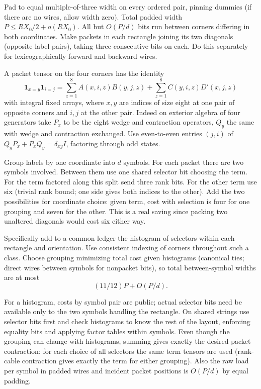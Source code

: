 \documentclass[11pt,letterpaper]{article}
\theoremstyle{definition}
\numberwithin{equation}{section}
\begin{document}
Pad to equal multiple-of-three width on every ordered pair, pinning dummies (if there
are no wires, allow width zero). Total padded width $P\le RX_0/2+o(RX_0)$. All but $O(P/d)$
bits run between corners differing in both coordinates. Make packets in each rectangle
joining its two diagonals (opposite label pairs), taking three consecutive bits on each. Do
this separately for lexicographically forward and backward wires.

A packet tensor on the four corners has the identity
\[
  \mathbf{1}_{x=y}\mathbf{1}_{i=j} = \sum_{z=1}^8 A(x,i,z)B(y,j,z) + \sum_{z=1}^8 C(y,i,z)D'(x,j,z)
\]
with integral fixed arrays, where $x,y$ are indices of size eight at one pair of opposite corners
and $i,j$ at the other pair. Indeed on exterior algebra of four generators take $P_x$ to be the
eight wedge and contraction operators, $Q_y$ the same with wedge and contraction exchanged.
Use even-to-even entries $(j,i)$ of $Q_y P_x+P_x Q_y=\delta_{xy}I$, factoring through odd states.

Group labels by one coordinate into $d$ symbols. For each packet there are two symbols
involved. Between them use one shared selector bit choosing the term. For the term factored
along this split send three rank bits. For the other term use six (trivial rank bound; one side
gives both indices to the other). Add the two possibilities for coordinate choice: given term,
cost with selection is four for one grouping and seven for the other. This is a real saving
since packing two unaltered diagonals would cost six either way.

Specifically add to a common ledger the histogram of selectors within each rectangle and
orientation. Use consistent indexing of corners throughout such a class. Choose grouping
minimizing total cost given histograms (canonical ties; direct wires between symbols for
nonpacket bits), so total between-symbol widths are at most
\[
  (11/12)P+O(P/d).
\]


For a histogram, costs by symbol pair are public; actual selector bits need be available only
to the two symbols handling the rectangle. On shared strings use selector bits first and
check histograms to know the rest of the layout, enforcing equality bits and applying factor
tables within symbols. Even though the grouping can change with histograms, summing
gives exactly the desired packet contraction: for each choice of all selectors the same term
tensors are used (rank-cable contraction gives exactly the term for either grouping). Also
the raw load per symbol in padded wires and incident packet positions is $O(P/d)$ by equal
padding.
\end{document}
